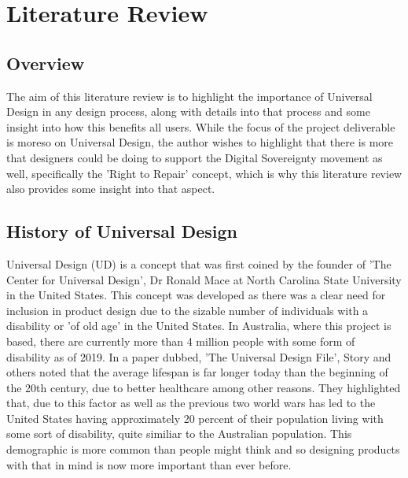 
\chapter{Literature Review} %

\label{Chapter2} %


\section{Overview}  

The aim of this literature review is to highlight the importance of Universal Design in any design process, along with details into that process and some insight into how this benefits all users.
While the focus of the project deliverable is moreso on Universal Design, the author wishes to highlight that there is more that designers could be doing to support the Digital Sovereignty movement as well, specifically the 'Right to Repair' concept, which is why this literature review also provides some insight into that aspect.


\section{History of Universal Design}
Universal Design (UD) is a concept that was first coined by the founder of 'The Center for Universal Design', Dr Ronald Mace at North Carolina State University in the United States\cite{ronald}.
This concept was developed as there was a clear need for inclusion in product design due to the sizable number of individuals with a disability or 'of old age' in the United States.
In Australia, where this project is based, there are currently more than 4 million people with some form of disability \cite{ausstats} as of 2019. 
In a paper dubbed, 'The Universal Design File'\cite{universalfile}, Story and others noted that the average lifespan is far longer today than the beginning of the 20th century, due to better healthcare among other reasons.
They highlighted that, due to this factor as well as the previous two world wars has led to the United States having approximately 20 percent of their population living with some sort of disability, quite similiar to the Australian population.
This demographic is more common than people might think and so designing products with that in mind is now more important than ever before.


